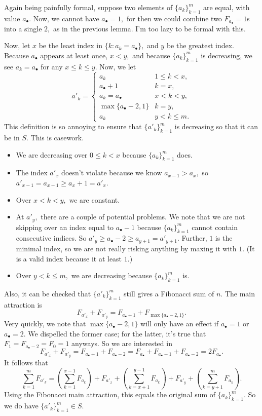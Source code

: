 Again being painfully formal, suppose two elements of $\{a_k\}_{k=1}^m$ are equal, with value $a_\bullet.$ Now, we cannot have $a_\bullet=1,$ for then we could combine two $F_{a_\bullet}=1$s into a single $2,$ as in the previous lemma. I'm too lazy to be formal with this.

Now, let $x$ be the least index in $\{k:a_k=a_\bullet\},$ and $y$ be the greatest index. Because $a_\bullet$ appears at least once, $x<y,$ and because $\{a_k\}_{k=1}^m$ is decreasing, we see $a_k=a_\bullet$ for any $x\le k\le y.$ Now, we let
\[a'_k=\begin{cases}
    a_k & 1\le k<x, \\
    a_\bullet+1 & k=x, \\
    a_k=a_\bullet & x<k<y, \\
    \max\{a_\bullet-2,1\} & k=y, \\
    a_k & y<k\le m.
\end{cases}\]
This definition is so annoying to ensure that $\{a'_k\}_{k=1}^m$ is decreasing so that it can be in $S.$ This is casework.
\begin{itemize}
    \item We are decreasing over $0\le k<x$ because $\{a_k\}_{k=1}^m$ does.
    \item The index $a'_x$ doesn't violate because we know $a_{x-1}>a_x,$ so $a'_{x-1}=a_{x-1}\ge a_x+1=a'_x.$
    \item Over $x<k<y,$ we are constant.
    \item At $a'_y,$ there are a couple of potential problems. We note that we are not skipping over an index equal to $a_\bullet-1$ because $\{a_k\}_{k=1}^m$ cannot contain consecutive indices. So $a'_y\ge a_\bullet-2\ge a_{y+1}=a'_{y+1}.$ Further, $1$ is the minimal index, so we are not really risking anything by maxing it with $1.$ (It is a valid index because it at least $1.$)
    \item Over $y<k\le m,$ we are decreasing because $\{a_k\}_{k=1}^m$ is.
\end{itemize}
Also, it can be checked that $\{a'_k\}_{k=1}^m$ still gives a Fibonacci sum of $n.$ The main attraction is
\[F_{a'_x}+F_{a'_y}=F_{a_\bullet+1}+F_{\max\{a_\bullet-2,1\}}.\]
Very quickly, we note that $\max\{a_\bullet-2,1\}$ will only have an effect if $a_\bullet=1$ or $a_\bullet=2.$ We dispelled the former case; for the latter, it's true that $F_1=F_{a_\bullet-2}=F_0=1$ anyways. So we are interested in
\[F_{a'_x}+F_{a'_y}=F_{a_\bullet+1}+F_{a_\bullet-2}=F_{a_\bullet}+F_{a_\bullet-1}+F_{a_\bullet-2}=2F_{a_\bullet}.\]
It follows that
\[\sum_{k=1}^mF_{a'_k}=\left(\sum_{k=1}^{x-1}F_{a_k}\right)+F_{a'_x}+\left(\sum_{k=x+1}^{y-1}F_{a_k}\right)+F_{a'_y}+\left(\sum_{k=y+1}^mF_{a_k}\right).\]
Using the Fibonacci main attraction, this equals the original sum of $\{a_k\}_{k=1}^m.$ So we do have $\{a'_k\}_{k=1}^m\in S.$

